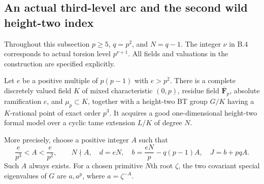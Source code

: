 \subsection{An actual third-level arc and the second wild height-two index}

Throughout this subsection $p\ge5$, $q=p^2$, and $N=q-1$.
The integer $\nu$ in B.4 corresponds to actual torsion level
$p^{\nu+1}$. All fields and valuations in the construction are
specified explicitly.

\begin{lemma}
\label{lem:B-RD100-arc}
Let $e$ be a positive multiple of $p(p-1)$ with $e>p^2$.
There is a complete discretely valued field $K$ of mixed
characteristic $(0,p)$, residue field $\overline{\mathbf F}_p$,
absolute ramification $e$, and $\mu_p\subset K$, together
with a height-two BT group $G/K$ having a $K$-rational point
of exact order $p^3$. It acquires a good one-dimensional
height-two formal model over a cyclic tame extension $L/K$
of degree $N$.

More precisely, choose a positive integer $A$ such that
\[
 \frac e{p^3}<A<\frac e{p^2},\qquad N\nmid A,
 \quad
 d=eN,\quad b=\frac{eN}{p}-q(p-1)A,\quad J=b+pqA.
                                                        \tag{B-RD100.1}
\]
Such $A$ always exists. For a chosen primitive $N$th root
$\zeta$, the two covariant special eigenvalues of $G$ are
$a,a^p$, where $a=\zeta^{-A}$.
\end{lemma}
